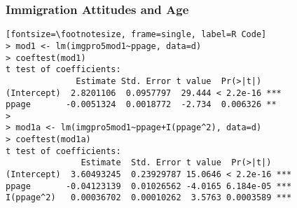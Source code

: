 \documentclass{beamer}
\numberwithin{equation}{section}
\begin{document}


\begin{frame}[fragile]
\frametitle{Immigration Attitudes and Age}

\begin{verbatim}[fontsize=\footnotesize, frame=single, label=R Code]
> mod1 <- lm(imgpro5mod1~ppage, data=d)
> coeftest(mod1)
t test of coefficients:
              Estimate Std. Error t value  Pr(>|t|)
(Intercept)  2.8201106  0.0957797  29.444 < 2.2e-16 ***
ppage       -0.0051324  0.0018772  -2.734  0.006326 **
>
> mod1a <- lm(imgpro5mod1~ppage+I(ppage^2), data=d)
> coeftest(mod1a)
t test of coefficients:
               Estimate  Std. Error t value  Pr(>|t|)
(Intercept)  3.60493245  0.23929787 15.0646 < 2.2e-16 ***
ppage       -0.04123139  0.01026562 -4.0165 6.184e-05 ***
I(ppage^2)   0.00036702  0.00010262  3.5763 0.0003589 ***
\end{verbatim}

\end{frame}


\end{document}
